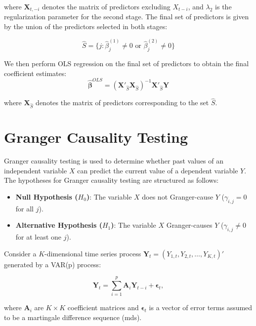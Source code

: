 \documentclass[11pt]{article}
\begin{document}
where \(\mathbf{X}_{t,-i}\) denotes the matrix of predictors excluding \(X_{t-i}\), and \(\lambda_2\) is the regularization parameter for the second stage. The final set of predictors is given by the union of the predictors selected in both stages:

\begin{equation}
\hat{S} = \{ j : \hat{\beta}^{(1)}_j \neq 0 \text{ or } \hat{\beta}^{(2)}_j \neq 0 \}
\end{equation}


We then perform OLS regression on the final set of predictors to obtain the final coefficient estimates:
\begin{equation}
\hat{\boldsymbol{\beta}}^{OLS} = (\mathbf{X}'_{\hat{S}} \mathbf{X}_{\hat{S}})^{-1} \mathbf{X}'_{\hat{S}} \mathbf{Y}
\end{equation}

where \(\mathbf{X}_{\hat{S}}\) denotes the matrix of predictors corresponding to the set \(\hat{S}\).

\section{Granger Causality Testing}


Granger causality testing is used to determine whether past values of an independent variable \(X\) can predict the current value of a dependent variable \(Y\). The hypotheses for Granger causality testing are structured as follows:

\begin{itemize}
    \item \textbf{Null Hypothesis (\(H_0\))}: The variable \(X\) does not Granger-cause \(Y\) (\(\gamma_{i,j} = 0\) for all \(j\)).
    \item \textbf{Alternative Hypothesis (\(H_1\))}: The variable \(X\) Granger-causes \(Y\) (\(\gamma_{i,j} \neq 0\) for at least one \(j\)).
\end{itemize}

Consider a \(K\)-dimensional time series process \(\mathbf{Y}_t = (Y_{1,t}, Y_{2,t}, \ldots, Y_{K,t})'\) generated by a VAR(p) process:

\begin{equation}
\mathbf{Y}_t = \sum_{i=1}^{p} \mathbf{A}_i \mathbf{Y}_{t-i} + \boldsymbol{\epsilon}_t,
\end{equation}

where \(\mathbf{A}_i\) are \(K \times K\) coefficient matrices and \(\boldsymbol{\epsilon}_t\) is a vector of error terms assumed to be a martingale difference sequence (mds).
\end{document}
